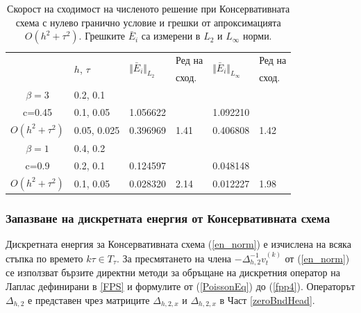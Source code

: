 \documentclass[a4paper]{article}
\newcommand{\rf}[1]{(\ref{#1})}
\theoremstyle{remark}
\begin{document}
\begin{table}[ht]
\centering
\small
		\begin{tabular}{||c|l|ll|ll||}
			\hline
			\hline
      \multirow{2  }{*}{ }        & \multirow{2  }{*}{$h$, $\tau$}  &	\multirow{2  }{*}{  $\Vert \bar E_i \Vert_{L_2} $ } 	&Ред на & \multirow{2  }{*}{  $\Vert \bar E_i \Vert_{L_\infty}$ }	&Ред на   \\
	                                        &                                                &    										&  сход. & 										& сход. \\
   			\hline 
					\hline 
  $\beta=3$                 &0.2, 0.1          &                 &                &                  &                   \\
   c=0.45                     &0.1, 0.05       & 1.056622   &                & 1.092210 &                   \\
     $O(h^2 + \tau^ 2)$ &0.05, 0.025  & 0.396969    	& 1.41       	& 0.406808   &   1.42   \\
	   \hline
			\hline 
       $\beta=1$           & 0.4, 0.2       &                   &           &                 &   \\
                  c=0.9       & 0.2, 0.1        & 0.124597   &          &0.048148  &   \\
  $O(h^2+ \tau^2)$  & 0.1, 0.05       & 0.028320   & 2.14  &0.012227  & 1.98 \\
	   \hline
			\hline 
		\end{tabular}
		\caption{Скорост на сходимост на численото решение при Консервативната схема с нулево гранично условие и грешки от апроксимацията $O(h^{2} + \tau^2 )$. Грешките $\bar E_i$ са измерени в $L_2$ и $L_\infty$ норми.}
\label{tableC}
\end{table}

\subsubsection{ Запазване на дискретната енергия от Консервативната схема}\label{enCons}
Дискретната енергия за Консервативната схема \rf{en_norm} е изчислена на всяка стъпка по времето $k \tau \in T_\tau$. За пресмятането на члена $-\Delta_{h,2}^{-1}v_{t}^{(k)}$ от \rf{en_norm} се използват бързите директни методи за обръщане на дискретния оператор на Лаплас дефинирани в \ref{FPS} и формулите от \rf{PoissonEq} до \rf{fpp4}. Операторът $\Delta_{h,2}$ е представен чрез матриците $\Delta_{h,2,x}$ и $\Delta_{h,2,x}$ в Част \ref{zeroBndHead}.
\end{document}
